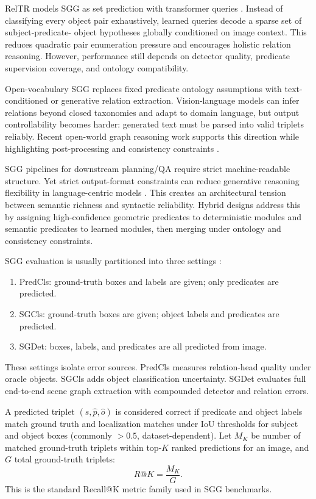     RelTR models SGG as set prediction with transformer queries \cite{cong_reltr_2023}. Instead of classifying every object pair exhaustively, learned queries decode a sparse set of subject-predicate-
  object hypotheses globally conditioned on image context. This reduces quadratic pair enumeration pressure and encourages holistic relation reasoning. However, performance still depends on detector
  quality, predicate supervision coverage, and ontology compatibility.

    Open-vocabulary SGG replaces fixed predicate ontology assumptions with text-conditioned or generative relation extraction. Vision-language models can infer relations beyond closed taxonomies and adapt
  to domain language, but output controllability becomes harder: generated text must be parsed into valid triplets reliably. Recent open-world graph reasoning work supports this direction while
  highlighting post-processing and consistency constraints \cite{wang_indvissgg_2025}.

    SGG pipelines for downstream planning/QA require strict machine-readable structure. Yet strict output-format constraints can reduce generative reasoning flexibility in language-centric models
  \cite{tam_let_2024}. This creates an architectural tension between semantic richness and syntactic reliability. Hybrid designs address this by assigning high-confidence geometric predicates to
  deterministic modules and semantic predicates to learned modules, then merging under ontology and consistency constraints.

    SGG evaluation is usually partitioned into three settings \cite{zhu_scene_2022}:
  \begin{enumerate}
  \item PredCls: ground-truth boxes and labels are given; only predicates are predicted.
  \item SGCls: ground-truth boxes are given; object labels and predicates are predicted.
  \item SGDet: boxes, labels, and predicates are all predicted from image.
  \end{enumerate}
  These settings isolate error sources. PredCls measures relation-head quality under oracle objects. SGCls adds object classification uncertainty. SGDet evaluates full end-to-end scene graph extraction
  with compounded detector and relation errors.

    A predicted triplet \((\hat{s},\hat{p},\hat{o})\) is considered correct if predicate and object labels match ground truth and localization matches under IoU thresholds for subject and object boxes
  (commonly \(>0.5\), dataset-dependent). Let \(M_K\) be number of matched ground-truth triplets within top-\(K\) ranked predictions for an image, and \(G\) total ground-truth triplets:
  \[
  R@K = \frac{M_K}{G}.
  \]
  This is the standard Recall@K metric family used in SGG benchmarks.

